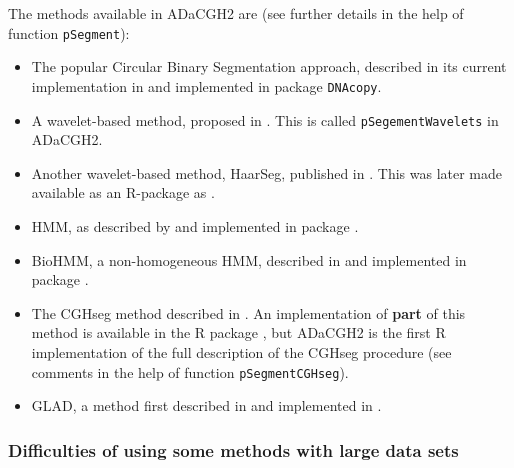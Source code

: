 \documentclass[a4paper,11pt]{article}
\begin{document}
The methods available in ADaCGH2 are (see further details in the help of
function \texttt{pSegment}):

\begin{itemize}

\item The popular Circular Binary Segmentation approach, described in its
  current implementation in \cite{CBS-paper} and implemented in package
  \texttt{DNAcopy}.

\item A wavelet-based method, proposed in \cite{waves-hsu}. This is called
  \texttt{pSegementWavelets} in ADaCGH2. 

\item Another wavelet-based method, HaarSeg, published in
  \cite{haarseg-paper}. This was later made available as an R-package as
  \cite{haar-package}.


\item HMM, as described by \cite{hmm-fridlyand} and implemented in package
  \cite{aCGHpackage}. 

\item BioHMM, a non-homogeneous HMM, described in \cite{biohmm} and
  implemented in package \cite{snapCGH}. 


\item The CGHseg method described in \cite{cghseg}. An implementation of
  \textbf{part} of this method is available in the R package
  \cite{tilingarray}, but ADaCGH2 is the first R implementation of the
  full description of the CGHseg procedure (see comments in the help of
  function \texttt{pSegmentCGHseg}).


\item GLAD, a method first described in \cite{glad-paper} and implemented
  in \cite{glad-package}.

\end{itemize}


\subsubsection{Difficulties of using some methods with large data sets}\label{methodproblems}
\end{document}
